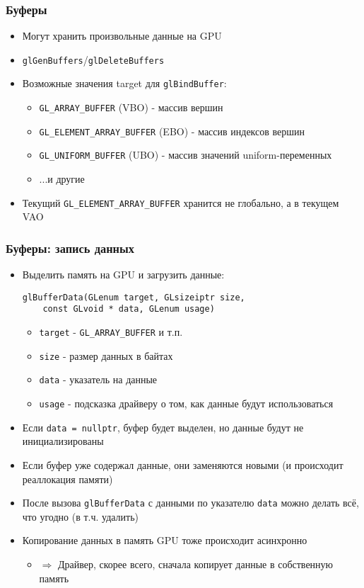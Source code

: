 \documentclass{beamer}
\begin{document}
\begin{frame}[fragile]
\frametitle{Буферы}
\begin{itemize}
\item Могут хранить произвольные данные на GPU
\pause
\item \verb|glGenBuffers|/\verb|glDeleteBuffers|
\pause
\item Возможные значения target для \verb|glBindBuffer|:
\begin{itemize}
\item \verb|GL_ARRAY_BUFFER| (VBO) - массив вершин
\pause
\item \verb|GL_ELEMENT_ARRAY_BUFFER| (EBO) - массив индексов вершин
\pause
\item \verb|GL_UNIFORM_BUFFER| (UBO) - массив значений uniform-переменных
\pause
\item ...и другие
\end{itemize}
\pause
\item Текущий \verb|GL_ELEMENT_ARRAY_BUFFER| хранится не глобально, а в текущем VAO
\end{itemize}
\end{frame}

\begin{frame}[fragile]
\frametitle{Буферы: запись данных}
\begin{itemize}
\item Выделить память на GPU и загрузить данные:
\begin{verbatim}
glBufferData(GLenum target, GLsizeiptr size,
    const GLvoid * data, GLenum usage)
\end{verbatim}
\pause
\begin{itemize}
\item \verb|target| - \verb|GL_ARRAY_BUFFER| и т.п.
\item \verb|size| - размер данных в байтах
\item \verb|data| - указатель на данные
\item \verb|usage| - подсказка драйверу о том, как данные будут использоваться
\end{itemize}
\pause
\item Если \verb|data = nullptr|, буфер будет выделен, но данные будут не инициализированы
\pause
\item Если буфер уже содержал данные, они заменяются новыми (и происходит реаллокация памяти)
\pause
\item После вызова \verb|glBufferData| с данными по указателю \verb|data| можно делать всё, что угодно (в т.ч. удалить)
\item Копирование данных в память GPU тоже происходит асинхронно
\pause
\begin{itemize}
\item \begin{math}\Rightarrow\end{math} Драйвер, скорее всего, сначала копирует данные в собственную память
\end{itemize}
\end{itemize}
\end{frame}
\end{document}
